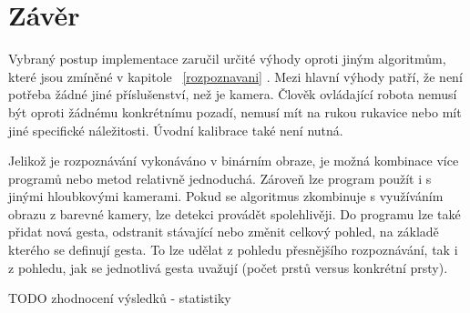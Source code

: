 \chapter{Závěr}
Vybraný postup implementace zaručil určité výhody oproti jiným algoritmům, které jsou zmíněné v kapitole ~\ref{rozpoznavani} . Mezi hlavní výhody patří, že není potřeba žádné jiné příslušenství, než je kamera. Člověk ovládající robota nemusí  být oproti žádnému konkrétnímu pozadí, nemusí mít na rukou rukavice nebo mít jiné specifické náležitosti. Úvodní kalibrace také není nutná. 

Jelikož je rozpoznávání vykonáváno v binárním obraze, je možná kombinace více programů nebo metod relativně jednoduchá. Zároveň lze program použít i s jinými hloubkovými kamerami. Pokud se algoritmus zkombinuje s využíváním obrazu z barevné kamery, lze detekci provádět spolehlivěji.
Do programu lze také přidat nová gesta, odstranit stávající nebo změnit celkový pohled, na základě kterého se definují gesta. To lze udělat z pohledu přesnějšího rozpoznávání, tak i z pohledu, jak se jednotlivá gesta uvažují (počet prstů versus konkrétní prsty). 

TODO zhodnocení výsledků - statistiky


\endinput
